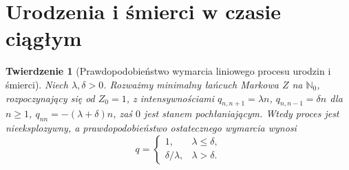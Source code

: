 \documentclass[11pt,a4paper,oneside]{report}
\numberwithin{equation}{chapter}
\theoremstyle{plain}
\newtheorem{twierdzenie}{Twierdzenie}[chapter]
\theoremstyle{definition}
\theoremstyle{remark}
\newcommand{\N}{\mathbb{N}}
\begin{document}
\section{Urodzenia i śmierci w czasie ciągłym}
\begin{twierdzenie}[Prawdopodobieństwo wymarcia liniowego procesu urodzin i śmierci]
Niech $\lambda,\delta>0$. Rozważmy minimalny łańcuch Markowa
$Z$ na $\N_0$, rozpoczynający się od $Z_0=1$, z intensywnościami
$q_{n,n+1}=\lambda n$, $q_{n,n-1}=\delta n$ dla $n\ge1$,
$q_{nn}=-(\lambda+\delta)n$, zaś $0$ jest stanem pochłaniającym.
Wtedy proces jest nieeksplozywny, a prawdopodobieństwo
ostatecznego wymarcia wynosi
\[
q=\begin{cases}1,&\lambda\le\delta,\\
\delta/\lambda,&\lambda>\delta.
\end{cases}
\]
\end{twierdzenie}
\end{document}
